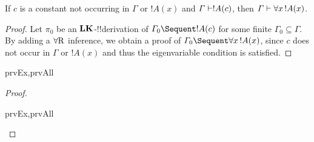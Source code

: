 \documentclass[../../../include/open-logic-section]{subfiles}
\begin{document}

\begin{thm}
 If $c$ is a constant not occurring
in $\Gamma$ or $!A(x)$ and $\Gamma \Proves !A(c)$, then $\Gamma
\Proves \lforall[x][!A(x)]$.
\end{thm}

\begin{proof}
Let $\pi_0$ be an $\mathbf{LK}$-!!{derivation} of $\Gamma_0 \Sequent !A(c)$
for some finite $\Gamma_0 \subseteq \Gamma$.  By adding a
$\RightR{\lforall}$ inference, we obtain a proof of $\Gamma_0 \Sequent
\lforall[x][!A(x)]$, since $c$ does not occur in $\Gamma$ or $!A(x)$
and thus the eigenvariable condition is satisfied.
\end{proof}

\begin{prop}
\begin{tagenumerate}{prvEx,prvAll}
\end{tagenumerate}
\end{prop}

\begin{proof}
\begin{tagenumerate}{prvEx,prvAll}
\end{tagenumerate}
\end{proof}
\end{document}
